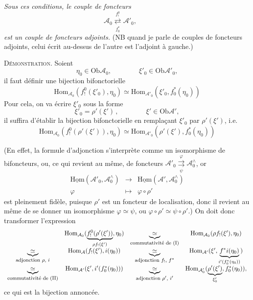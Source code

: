 \documentclass[11pt]{article}
\newcommand{\printedpage}[1]{\marginpar{\footnotesize p.~#1}}
\newcommand{\msp}[1]{\marginpar{\footnotesize [#1]}}
\newcommand{\Ob}{\mathrm{Ob}}
\newcommand{\Hom}{\mathrm{Hom}}
\newcommand{\uHom}{\underline{\mathrm{Hom}}}
\newcommand{\cA}{\mathcal{A}}
\newcommand{\adj}[2]{\mathrel{\underset{#2}{\overset{#1}{\rightleftarrows}}}}
\begin{document}
\textit{Sous ces conditions, le couple de foncteurs}
\[
\cA_0 \adj{f_!^0}{f_0^*} \cA'_0, \qquad
\]
\textit{est un couple de foncteurs adjoints.} (NB quand je parle de couples de foncteurs adjoints, celui écrit au-dessus de l'autre est l'adjoint à gauche.)

\textsc{Démonstration}. Soient
\[
\eta_0 \in \Ob \cA_0, \qquad\qquad \xi'_0 \in \Ob \cA'_0,
\]
il faut définir une bijection bifonctorielle
\[
\Hom_{\cA_0}(f_!^0(\xi'_0), \eta_0) \simeq \Hom_{\cA'_0}(\xi'_0, f_0^*(\eta_0))
\]
Pour cela, on va écrire $\xi'_0$ sous la forme
\[
\xi'_0 = \rho'(\xi')\,, \qquad\qquad \xi' \in \Ob \cA',
\]
il suffira d'établir la bijection bifonctorielle en remplaçant $\xi'_0$ par $\rho'(\xi')$, i.e.
\[
\Hom_{\cA_0}(f_!^0(\rho'(\xi')), \eta_0) \simeq \Hom_{\cA'_0}(\rho'(\xi'), f_0^*(\eta_0))
\]


\printedpage{92}

\msp{page 150}
(En effet, la formule d'adjonction s'interprète comme un isomorphisme de bifoncteurs, ou, ce qui revient au même, de foncteurs $\cA'_0 \mathrel{\underset{\psi}{\overset{\varphi}{\rightrightarrows}}} \cA_0^{\wedge}$, or
\[
\begin{array}{ccc}
\uHom(\cA'_0, \cA_0^{\wedge}) & \longrightarrow & \uHom(\cA', \cA_0^{\wedge}) \\[1ex]
\varphi & \longmapsto & \varphi \circ \rho'
\end{array}
\]
est pleinement fidèle, puisque $\rho'$ est un foncteur de localisation, donc il revient au même de se donner un isomorphisme $\varphi \simeq \psi$, ou $\varphi \circ \rho' \simeq \psi \circ \rho'$.) On doit donc transformer l'expression
\[
\begin{array}{cccc}
 & \Hom_{\cA_0}(\underbrace{f_!^0(\rho'(\xi'))}_{\rho f_!(\xi')}, \eta_0) & \underbrace{\simeq}_{\text{\footnotesize commutativité de (I)}} & \Hom_{\cA_0}(\rho f_!(\xi'), \eta_0) \\[3ex]
\underbrace{\simeq}_{\text{\footnotesize adjonction $\rho$, $i$}} & \Hom_{\cA}(f_!(\xi'), i(\eta_0)) & \underbrace{\simeq}_{\text{\footnotesize adjonction $f_!$, $f^*$}} & \Hom_{\cA'}(\xi', \underbrace{f^*i(\eta_0)}_{i'(f_0^*(\eta_0))}) \\[3ex]
\underbrace{\simeq}_{\text{\footnotesize commutativité de (II)}} & \Hom_{\cA'}(\xi', i'(f_0^*(\eta_0))) & \underbrace{\simeq}_{\text{\footnotesize adjonction $\rho'$, $i'$}} & \Hom_{\cA'_0}(\underbrace{\rho'(\xi')}_{\xi'_0}, f_0^*(\eta_0)),
\end{array}
\]
ce qui est la bijection annoncée.
\end{document}
